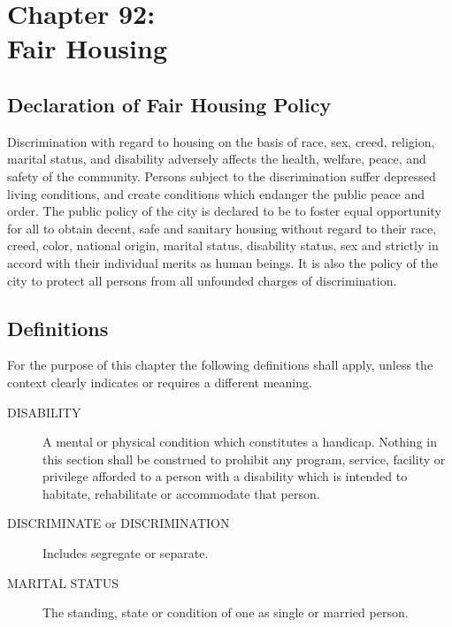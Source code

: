 \chapter*{Chapter 92: \\
	Fair Housing}
    \vfill
    \minitoc
    \pagebreak

\section{Declaration of Fair Housing Policy}
Discrimination with regard to housing on the basis of race, sex, creed, religion, marital status, and disability adversely affects the health, welfare, peace, and safety of the community.  Persons subject to the discrimination suffer depressed living conditions, and create conditions which endanger the public peace and order. The public policy of the city is declared to be to foster equal opportunity for all to obtain decent, safe and sanitary housing without regard to their race, creed, color, national origin, marital status, disability status, sex and strictly in accord with their individual merits as human beings. It is also the policy of the city to protect all persons from all unfounded charges of discrimination.

\section{Definitions}
For the purpose of this chapter the following definitions shall apply, unless the context clearly indicates or requires a different meaning.
\begin{description}
    \item[DISABILITY] A mental or physical condition which constitutes a handicap.  Nothing in this section shall be construed to prohibit any program, service, facility or privilege afforded to a person with a disability which is intended to habitate, rehabilitate or accommodate that person.
    \item[DISCRIMINATE or DISCRIMINATION] Includes segregate or separate.
    \item[MARITAL STATUS] The standing, state or condition of one as single or married person.
\end{description}

